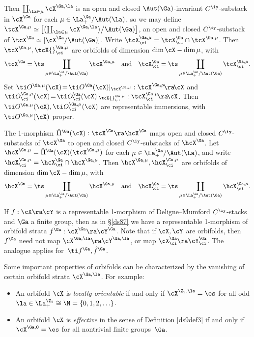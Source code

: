 \documentclass{article}
\begin{document}
\begin{dfn}
Then $\coprod_{\la\in\mu}\cX^{\Ga,\la}$ is an open and closed
$\Aut(\Ga)$-invariant $C^\iy$-substack in $\cX^\Ga$ for each
$\mu\in\La^\Ga_+/\Aut(\La)$, so we may define $\tcX^{\Ga,\mu}\simeq
\bigl[\bigl(\coprod_{\la\in\mu}
\cX^{\Ga,\la}\bigr)\big/\Aut(\Ga)\bigr]$, an open and closed
$C^\iy$-substack of $\tcX^\Ga\simeq[\cX^\Ga/ \Aut(\Ga)]$. Write
$\tcX^{\Ga,\mu}_\ci=\tcX^\Ga_\ci\cap \tcX^{\Ga,\mu}$. Then
$\tcX^{\Ga,\mu},\tcX {}^{\Ga,\mu}_\ci$ are orbifolds of dimension
$\dim\cX-\dim\mu$, with
\begin{equation*}
\tcX^\Ga=\ts\coprod_{\mu\in\La^\Ga_+/\Aut(\Ga)}\tcX^{\Ga,\mu}
\quad\text{and}\quad \tcX^\Ga_\ci=
\ts\coprod_{\mu\in\La^\Ga_+/\Aut(\Ga)} \tcX^{\Ga,\mu}_\ci.
\end{equation*}
Set $\ti O{}^{\Ga,\mu}(\cX)\!=\!\ti O{}^\Ga(\cX)\vert_{\smash{
\tcX^{\Ga,\mu}}}:\tcX^{\Ga,\mu}\!\ra\!\cX$ and $\ti
O{}^{\Ga,\mu}_\ci(\cX)\!=\!\ti O{}^\Ga_\ci(\cX)\vert_{\smash{\tcX
{}^{\Ga,\mu}_\ci}}:\tcX^{\Ga,\mu}_\ci\!\ra\!\cX$. Then $\ti
O^{\Ga,\mu}(\cX),\ti O{}^{\Ga,\mu}_\ci(\cX)$ are representable
immersions, with $\ti O^{\Ga,\mu}(\cX)$ proper.

The 1-morphism $\hat\Pi{}^\Ga(\cX):\tcX^\Ga\ra\hcX^\Ga$ maps open
and closed $C^\iy$-substacks of $\tcX^\Ga$ to open and closed
$C^\iy$-substacks of $\hcX^\Ga$. Let
$\hcX^{\Ga,\mu}=\hat\Pi{}^\Ga(\cX) (\tcX^{\Ga,\mu})$ for each
$\mu\in\La^\Ga_+/\Aut(\La)$, and write
$\hcX^{\Ga,\mu}_\ci=\hcX^\Ga_\ci\cap \hcX^{\Ga,\mu}$. Then
$\hcX^{\Ga,\mu}, \hcX^{\Ga,\mu}_\ci$ are orbifolds of dimension
$\dim\cX-\dim\mu$, with
\begin{equation*}
\hcX^\Ga=\ts\coprod_{\mu\in\La^\Ga_+/\Aut(\Ga)}\hcX^{\Ga,\mu}
\quad\text{and}\quad \hcX^\Ga_\ci=
\ts\coprod_{\mu\in\La^\Ga_+/\Aut(\Ga)} \hcX^{\Ga,\mu}_\ci.
\end{equation*}
\label{ds9def4}
\end{dfn}

If $f:\cX\ra\cY$ is a representable 1-morphism of Deligne--Mumford
$C^\iy$-stacks and $\Ga$ a finite group, then as in \S\ref{ds87} we
have a representable 1-morphism of orbifold strata
$f^\Ga:\cX^\Ga\ra\cY^\Ga$. Note that if $\cX,\cY$ are orbifolds,
then $f^\Ga$ need not map $\cX^{\Ga,\la}\ra\cY^{\Ga,\la}$, or map
$\cX^\Ga_\ci\ra\cY^\Ga_\ci$. The analogue applies for~$\ti
f{}^\Ga,\hat f{}^\Ga$.

Some important properties of orbifolds can be characterized by the
vanishing of certain orbifold strata $\cX^{\Ga,\la}$. For example:
\begin{itemize}
\setlength{\itemsep}{0pt}
\setlength{\parsep}{0pt}
\item An orbifold $\cX$ is {\it locally
orientable\/} if and only if
$\cX^{\Z_2,\la}=\es$ for all odd $\la\in\La^{\Z_2}_+
\cong\N=\{0,1,2,\ldots\}$.
\item An orbifold $\cX$ is {\it
effective\/} in the sense of Definition
\ref{ds9def3} if and only if $\cX^{\Ga,0}=\es$ for all
nontrivial finite groups~$\Ga$.
\end{itemize}
\end{document}
